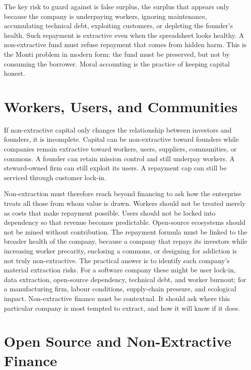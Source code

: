 \documentclass[11pt,a4paper,oneside]{book}
\begin{document}
The key risk to guard against is false surplus, the surplus that appears only because the company is underpaying workers, ignoring maintenance, accumulating technical debt, exploiting customers, or depleting the founder's health. Such repayment is extractive even when the spreadsheet looks healthy. A non-extractive fund must refuse repayment that comes from hidden harm. This is the Monti problem in modern form: the fund must be preserved, but not by consuming the borrower. Moral accounting is the practice of keeping capital honest.

\section*{Workers, Users, and Communities}

If non-extractive capital only changes the relationship between investors and founders, it is incomplete. Capital can be non-extractive toward founders while companies remain extractive toward workers, users, suppliers, communities, or commons. A founder can retain mission control and still underpay workers. A steward-owned firm can still exploit its users. A repayment cap can still be serviced through customer lock-in.

Non-extraction must therefore reach beyond financing to ask how the enterprise treats all those from whom value is drawn. Workers should not be treated merely as costs that make repayment possible. Users should not be locked into dependency so that revenue becomes predictable. Open-source ecosystems should not be mined without contribution. The repayment formula must be linked to the broader health of the company, because a company that repays its investors while increasing worker precarity, enclosing a commons, or designing for addiction is not truly non-extractive. The practical answer is to identify each company's material extraction risks. For a software company these might be user lock-in, data extraction, open-source dependency, technical debt, and worker burnout; for a manufacturing firm, labour conditions, supply-chain pressure, and ecological impact. Non-extractive finance must be contextual. It should ask where this particular company is most tempted to extract, and how it will know if it does.

\section*{Open Source and Non-Extractive Finance}
\end{document}
